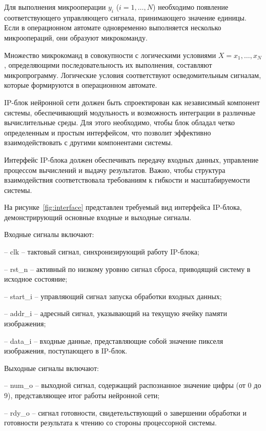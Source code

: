 Для выполнения микрооперации \( y_i \) (\( i = 1, \dots, N \)) необходимо 
появление соответствующего управляющего сигнала, принимающего значение единицы. 
Если в операционном автомате одновременно выполняется несколько микроопераций, 
они образуют микрокоманду.  

Множество микрокоманд в совокупности с логическими условиями 
\(X = x_1, \dots, x_N \), определяющими последовательность их выполнения, 
составляют микропрограмму. Логические условия соответствуют осведомительным 
сигналам, которые формируются в операционном автомате.

IP-блок нейронной сети должен быть спроектирован как независимый компонент 
системы, обеспечивающий модульность и возможность интеграции в различные 
вычислительные среды. Для этого необходимо, чтобы блок обладал четко 
определенным и простым интерфейсом, что позволит эффективно взаимодействовать 
с другими компонентами системы.

Интерфейс IP-блока должен обеспечивать передачу входных данных, управление 
процессом вычислений и выдачу результатов. Важно, чтобы структура 
взаимодействия соответствовала требованиям к гибкости и масштабируемости 
системы. 

На рисунке~\ref{fig:interface} представлен требуемый вид интерфейса 
IP-блока, демонстрирующий основные входные и выходные сигналы.

Входные сигналы включают:

– clk – тактовый сигнал, синхронизирующий работу IP-блока;

– rst\_n – активный по низкому уровню сигнал сброса, приводящий систему в исходное 
состояние;

– start\_i – управляющий сигнал запуска обработки входных данных;

– addr\_i – адресный сигнал, указывающий на текущую ячейку памяти изображения;

– data\_i – входные данные, представляющие собой значение пикселя изображения, 
поступающего в IP-блок.

Выходные сигналы включают:

– num\_o – выходной сигнал, содержащий распознанное значение цифры (от 0 до 9), 
представляющее итог работы нейронной сети;

– rdy\_o – сигнал готовности, свидетельствующий о завершении обработки и 
готовности результата к чтению со стороны процессорной системы.



